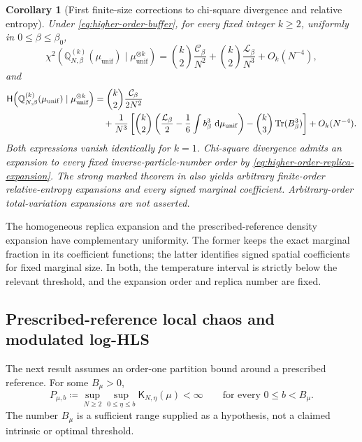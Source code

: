 \documentclass[11pt,reqno]{amsart}
\numberwithin{equation}{section}
\theoremstyle{plain}
\newtheorem{cor}[cor]{Corollary}
\theoremstyle{definition}
\newcommand{\dd}{\mathop{}\!\mathrm d}
\newcommand{\Q}{\mathbb Q}
\newcommand{\Tr}{\operatorname{Tr}}
\newcommand{\be}{\beta}
\newcommand{\K}{\mathsf K}
\newcommand{\Hr}{\mathsf H}
\newcommand{\muunif}{\mu_{\mathrm{unif}}}
\begin{document}
\begin{cor}[First finite-size corrections to chi-square divergence and relative entropy]
\label{cor:higher-order-divergences}
Under \eqref{eq:higher-order-buffer}, for every fixed integer $k\geq2$, uniformly in $0\leq\be\leq\be_0$,
\begin{equation}
 \chi^2\!\left(\Q_{N,\be}^{(k)}(\muunif)\mid\muunif^{\otimes k}\right)
 =\binom{k}{2}\frac{\mathcal C_{\be}}{N^2}
 +\binom{k}{2}\frac{\mathcal L_{\be}}{N^3}
 +O_k(N^{-4}),
 \label{eq:higher-order-chi}
\end{equation}
and
\begin{align}
 \Hr\!\left(\Q_{N,\be}^{(k)}(\muunif)\mid\muunif^{\otimes k}\right)
 &=\binom{k}{2}\frac{\mathcal C_{\be}}{2N^2}
 \notag\\
 &\quad+\frac1{N^3}\left[
 \binom{k}{2}\left(\frac{\mathcal L_{\be}}2-\frac16\int b_{\be}^3\,\dd\muunif\right)
 -\binom{k}{3}\Tr(B_{\be}^3)
 \right]
 +O_k(N^{-4}).
 \label{eq:higher-order-entropy}
\end{align}
Both expressions vanish identically for $k=1$.  Chi-square divergence admits an expansion to every fixed inverse-particle-number order by \eqref{eq:higher-order-replica-expansion}.  The strong marked theorem in  also yields arbitrary finite-order relative-entropy expansions and every signed marginal coefficient.  Arbitrary-order total-variation expansions are not asserted.
\end{cor}

The homogeneous replica expansion and the prescribed-reference density expansion have complementary uniformity. The former keeps the exact marginal fraction in its coefficient functions; the latter identifies signed spatial coefficients for fixed marginal size. In both, the temperature interval is strictly below the relevant threshold, and the expansion order and replica number are fixed.

\subsection{Prescribed-reference local chaos and modulated log-HLS}
\label{subsec:prescribed-local-chaos-introduction}

The next result assumes an order-one partition bound around a prescribed reference. For some $B_\mu>0$,
\begin{equation}
 P_{\mu,b}\coloneqq
 \sup_{N\geq2}\sup_{0\leq\eta\leq b}\K_{N,\eta}(\mu)<\infty
 \qquad\text{for every }0\leq b<B_\mu.
 \label{eq:nonuniform-order-one-input}
\end{equation}
The number $B_\mu$ is a sufficient range supplied as a hypothesis, not a claimed intrinsic or optimal threshold.
\end{document}
